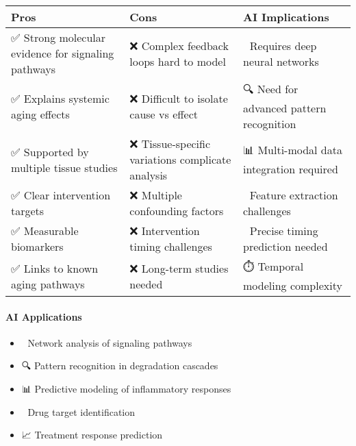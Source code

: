 \begin{longtable}[]{@{}
  >{\raggedright\arraybackslash}p{}
  >{\raggedright\arraybackslash}p{}
  >{\raggedright\arraybackslash}p{}@{}}
\toprule\noalign{}
\begin{minipage}[b]{\linewidth}\raggedright
Pros
\end{minipage} & \begin{minipage}[b]{\linewidth}\raggedright
Cons
\end{minipage} & \begin{minipage}[b]{\linewidth}\raggedright
AI Implications
\end{minipage} \\
\midrule\noalign{}
\endhead
\bottomrule\noalign{}
\endlastfoot
✅ Strong molecular evidence for signaling pathways & ❌ Complex
feedback loops hard to model & 🤖 Requires deep neural networks \\
✅ Explains systemic aging effects & ❌ Difficult to isolate cause vs
effect & 🔍 Need for advanced pattern recognition \\
✅ Supported by multiple tissue studies & ❌ Tissue-specific variations
complicate analysis & 📊 Multi-modal data integration required \\
✅ Clear intervention targets & ❌ Multiple confounding factors & 🧬
Feature extraction challenges \\
✅ Measurable biomarkers & ❌ Intervention timing challenges & 🎯
Precise timing prediction needed \\
✅ Links to known aging pathways & ❌ Long-term studies needed & ⏱️
Temporal modeling complexity \\
\end{longtable}

\paragraph{AI Applications}\label{ai-applications}

\begin{itemize}
\tightlist
\item
  🤖 Network analysis of signaling pathways
\item
  🔍 Pattern recognition in degradation cascades
\item
  📊 Predictive modeling of inflammatory responses
\item
  💊 Drug target identification
\item
  📈 Treatment response prediction
\end{itemize}


